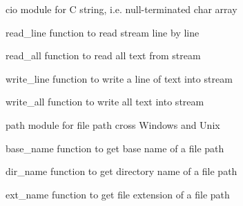 
\begin{DoxyItemize}
\item {\ttfamily cio} module for C string, i.\+e. null-\/terminated {\ttfamily char} array
\begin{DoxyItemize}
\item {\ttfamily read\+\_\+line} function to read stream line by line
\item {\ttfamily read\+\_\+all} function to read all text from stream
\item {\ttfamily write\+\_\+line} function to write a line of text into stream
\item {\ttfamily write\+\_\+all} function to write all text into stream
\end{DoxyItemize}
\item {\ttfamily path} module for file path cross Windows and Unix
\begin{DoxyItemize}
\item {\ttfamily base\+\_\+name} function to get base name of a file path
\item {\ttfamily dir\+\_\+name} function to get directory name of a file path
\item {\ttfamily ext\+\_\+name} function to get file extension of a file path 
\end{DoxyItemize}
\end{DoxyItemize}